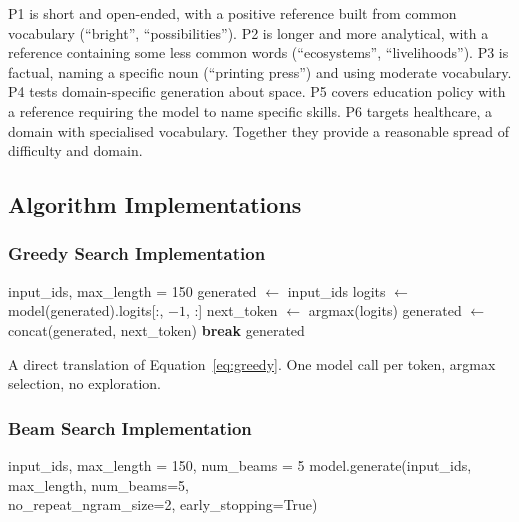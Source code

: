 \documentclass[12pt]{article}
\begin{document}
	P1 is short and open-ended, with a positive reference built from common vocabulary (``bright'', ``possibilities''). P2 is longer and more analytical, with a reference containing some less common words (``ecosystems'', ``livelihoods''). P3 is factual, naming a specific noun (``printing press'') and using moderate vocabulary. P4 tests domain-specific generation about space. P5 covers education policy with a reference requiring the model to name specific skills. P6 targets healthcare, a domain with specialised vocabulary. Together they provide a reasonable spread of difficulty and domain.
	
	\subsection{Algorithm Implementations}
	
	\subsubsection{Greedy Search Implementation}
	
	\begin{algorithm}[H]
		\caption{Greedy Search}
		\label{alg:greedy}
		\begin{algorithmic}[1]
			\Require input\_ids, max\_length = 150
			\State generated $\leftarrow$ input\_ids
			\State logits $\leftarrow$ model(generated).logits[:, $-1$, :]
			\State next\_token $\leftarrow$ argmax(logits)
			\State generated $\leftarrow$ concat(generated, next\_token)
			  \textbf{break}  \EndIf
			\EndWhile
			\Return generated
		\end{algorithmic}
	\end{algorithm}
	
	A direct translation of Equation~\eqref{eq:greedy}. One model call per token, argmax selection, no exploration.
	
	\subsubsection{Beam Search Implementation}
	
	\begin{algorithm}[H]
		\caption{Beam Search (via HuggingFace \texttt{model.generate()})}
		\label{alg:beam}
		\begin{algorithmic}[1]
			\Require input\_ids, max\_length = 150, num\_beams = 5
			\State \Return model.generate(input\_ids, max\_length, num\_beams=5,\\
			\hspace{4cm} no\_repeat\_ngram\_size=2, early\_stopping=True)
		\end{algorithmic}
	\end{algorithm}
	
\end{document}
